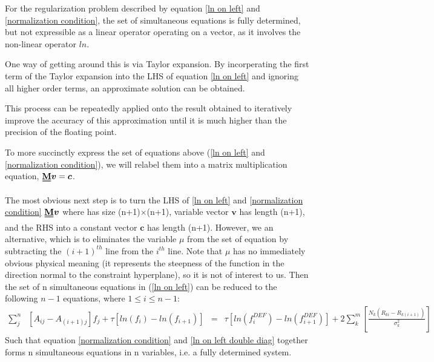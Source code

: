 \documentclass[a4paper, 12pt]{article}
\newcommand{\matr}[1]{\uuline{\bf{#1}}}
\newcommand{\ve}[1]{\boldsymbol{#1}}
\begin{document}

For the regularization problem described by equation \ref{ln on left} and \ref{normalization condition}, the set of simultaneous equations is fully determined, but not expressible as a linear operator \matr{M} operating on a vector, as it involves the non-linear operator $ln$.

One way of getting around this is via Taylor expansion. By incorperating the first term of the Taylor expansion into the LHS of equation \ref{ln on left} and ignoring all higher order terms, an approximate solution can be obtained.

This process can be repeatedly applied onto the result obtained to iteratively improve the accuracy of this approximation until it is much higher than the precision of the floating point.

To more succinctly express the set of equations above (\ref{ln on left} and \ref{normalization condition}), we will relabel them into a matrix multiplication equation, $\matr{M}\ve{v}=\ve{c}$.

The most obvious next step is to turn the LHS of \ref{ln on left} and \ref{normalization condition} $\matr{M}\ve{v}$ where \matr{M} has size (n+1)$\times$(n+1), variable vector $\ve{v}$ has length (n+1), and the RHS into a constant vector $\ve{c}$ has length (n+1). However, we an alternative, which is to eliminates the variable $\mu$ from the set of equation by subtracting the $(i+1)^{th}$ line from the $i^{th}$ line. Note that $\mu$ has no immediately obvious physical meaning (it represents the steepness of the function in the direction normal to the constraint hyperplane), so it is not of interest to us. Then the set of n simultaneous equations in (\ref{ln on left}) can be reduced to the following $n-1$ equations, where $1\le i\le n-1$:
\begin{align}
\sum_j^n& [A_{ij} - A_{(i+1)j}] f_j + \tau [ln(f_i)-ln(f_{i+1})] &=& \tau[ln(f_i^{DEF})-ln(f_{i+1}^{DEF})] + 2 \sum_k^m [\frac{N_k (R_{ki}-R_{k(i+1)})}{\sigma_k^2}] \label{ln on left double diag}
\end{align}
Such that equation \ref{normalization condition} and \ref{ln on left double diag} together forms n simultaneous equations in n variables, i.e. a fully determined system.
\end{document}
